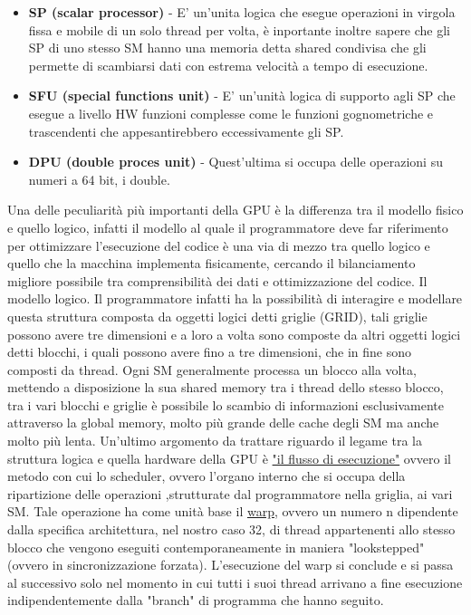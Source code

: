 \documentclass[10pt,a4paper]{article}
\begin{document}
\begin{itemize}
  \item \textbf{SP (scalar processor)} - E' un'unita logica che esegue operazioni in virgola fissa e mobile di un solo thread per volta, è inportante inoltre sapere che gli SP di uno stesso SM hanno una memoria detta shared condivisa che gli permette di scambiarsi dati con estrema velocità a tempo di esecuzione.
  \item \textbf{SFU (special functions unit)} - E' un'unità logica di supporto agli SP che esegue a livello HW funzioni complesse come le funzioni gognometriche e trascendenti che appesantirebbero eccessivamente gli SP.
  \item \textbf{DPU (double proces unit)} - Quest'ultima si occupa delle operazioni su numeri a 64 bit, i double.
\end{itemize}

Una delle peculiarità più importanti della GPU è la differenza tra il modello fisico e quello logico, infatti il modello al quale il programmatore deve far riferimento per ottimizzare l'esecuzione del codice è una via di mezzo tra quello logico e quello che la macchina implementa fisicamente, cercando il bilanciamento migliore possibile tra comprensibilità dei dati e ottimizzazione del codice.
Il modello logico. Il programmatore infatti ha la possibilità di interagire e modellare questa struttura composta da oggetti logici detti griglie (GRID), tali griglie possono avere tre dimensioni e a loro a volta sono composte da altri oggetti logici detti blocchi, i quali possono avere fino a tre dimensioni, che in fine sono composti da thread.
Ogni SM generalmente processa un blocco alla volta, mettendo a disposizione la sua shared memory tra i thread dello stesso blocco, tra i vari blocchi e griglie è possibile lo scambio di informazioni esclusivamente attraverso la global memory, molto più grande delle cache degli SM ma anche molto più lenta. 
Un'ultimo argomento da trattare riguardo il legame tra la struttura logica e quella hardware della GPU è \underline{"il flusso di esecuzione"} ovvero il metodo con cui lo scheduler, ovvero l'organo interno che si occupa della ripartizione delle operazioni ,strutturate dal programmatore nella griglia, ai vari SM. Tale operazione ha come unità base il \underline{warp}, ovvero un numero n dipendente dalla specifica architettura, nel nostro caso 32, di thread appartenenti allo stesso blocco che vengono eseguiti contemporaneamente in maniera "lookstepped" (ovvero in sincronizzazione forzata). L'esecuzione del warp si conclude e si passa al successivo solo nel momento in cui tutti i suoi thread arrivano a fine esecuzione indipendentemente dalla "branch" di programma che hanno seguito.
\\ \\
\end{document}
